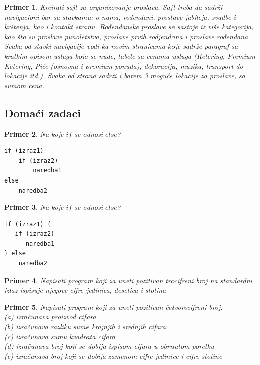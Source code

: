 \documentclass[a4paper]{article}
\newtheorem{primer}{Primer}[section]
\begin{document}
\begin{primer}
Kreirati sajt za organizovanje proslava. Sajt treba da sadrži navigacioni bar sa stavkama: o nama, rođendani, proslave jubileja, svadbe i krštenja, kao i kontakt stranu. Rođendanske proslave se sastoje iz više kategorija, kao što su proslave punoletstva, proslave prvih rodjendana i proslave rođendana. Svaka od stavki navigacije vodi ka novim stranicama koje sadrže paragraf sa kratkim opisom usluga koje se nude, tabele sa cenama usluga (Ketering, Premium Ketering, Piće (osnovna i premium ponuda), dekoracija, muzika, transport do lokacije itd.). Svaka od strana sadrži i barem 3 moguće lokacije za proslave, sa sumom cena.

\end{primer}


\subsection{Domaći zadaci}
\begin{primer}
Na koje $if$ se odnosi $else$?
\begin{verbatim}
if (izraz1)
    if (izraz2)
        naredba1
else
    naredba2
\end{verbatim}
\end{primer}
\begin{primer}
Na koje $if$ se odnosi $else$?
\begin{verbatim}
if (izraz1) {
   if (izraz2)
      naredba1
} else
    naredba2
\end{verbatim}
\end{primer}

\begin{primer}
Napisati program koji za uneti pozitivan trocifreni broj na
standardni izlaz ispisuje njegove cifre jedinica, desetica i stotina
\end{primer}

\begin{primer}
Napisati program koji za uneti pozitivan četvorocifreni
broj:\\
(a) izračunava proizvod cifara\\
(b) izračunava razliku sume krajnjih i srednjih cifara\\
(c) izračunava sumu kvadrata cifara\\
(d) izračunava broj koji se dobija ispisom cifara u obrnutom poretku\\
(e) izračunava broj koji se dobija zamenom cifre jedinice i cifre stotine\\
\end{primer}
\end{document}
